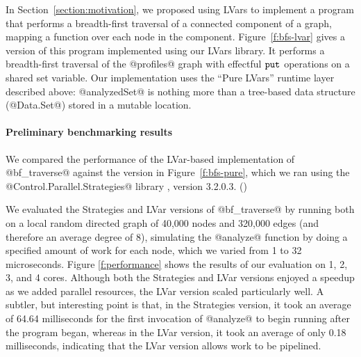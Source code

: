 In Section~\ref{section:motivation}, we proposed using LVars to
implement a program that performs a breadth-first traversal of a
connected component of a graph, mapping a function over each node in
the component.
Figure~\ref{f:bfs-lvar} gives a version of this program implemented using our LVars library.
It performs a breadth-first traversal of the 
 @profiles@ graph with effectful $\mbox{\texttt{put}}$
operations on a shared set variable.  
Our implementation uses the ``Pure LVars'' runtime layer described above: 
@analyzedSet@ is nothing more than a tree-based data structure
(@Data.Set@) stored in a mutable location.  

\paragraph{Preliminary benchmarking results}

We compared the performance of the LVar-based implementation of @bf_traverse@ against the version in Figure~\ref{f:bfs-pure}, which we ran using the 
\\ @Control.Parallel.Strategies@ library
\cite{marlow-par}, version 3.2.0.3. ()

We evaluated the Strategies and LVar versions of @bf_traverse@
by running both on a local random directed graph of 40,000 nodes and
320,000 edges (and therefore an average degree of 8), simulating the
@analyze@ function by doing a specified amount of work for each node,
which we varied from 1 to 32 microseconds.
Figure \ref{f:performance} shows the results of our evaluation on 1, 2, 3, and 4 cores.
Although both the Strategies and LVar versions enjoyed a
 speedup as we added parallel resources, the LVar
version scaled particularly well.
A subtler, but interesting point is that, in the Strategies version,
it took an average of 64.64 milliseconds for the first invocation of
@analyze@ to begin running after the program began, whereas in the
LVar version, it took an average of only 0.18 milliseconds,
indicating that the LVar version allows work to be
pipelined.



